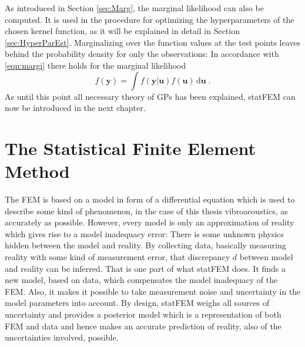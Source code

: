 \documentclass[%
  a4paper,oneside,%
  11pt,%
  smallchapters,
  style=printdev,
  extramargin,
  green,%
  rgb, <cmyk>
  ]{tubsbook}
\begin{document}
As introduced in Section \ref{sec:Marg}, the marginal likelihood can also be computed. It is used in the procedure for optimizing the hyperparameters of the chosen kernel function, as it will be explained in detail in Section \ref{sec:HyperParEst}. Marginalizing over the function values at the test points leaves behind the probability density for only the observations: In accordance with \eqref{eqn:margi} there holds for the marginal likelihood
\begin{equation}
f(\bm{y}) = \int f(\bm{y}|\bm{u}) f(\bm{u}) \, \mathrm{d}\bm{u} \;.
\label{eqn:marginGP}
\end{equation}
As until this point all necessary theory of GPs has been explained, statFEM can now be introduced in the next chapter.







\section{The Statistical Finite Element Method}
The FEM is based on a model in form of a differential equation which is used to describe some kind of phenomenon, in the case of this thesis vibroacoustics, as accurately as possible. However, every model is only an approximation of reality which gives rise to a model inadequacy error: There is some unknown physics hidden between the model and reality. By collecting data, basically measuring reality with some kind of measurement error, that discrepancy $d$ between model and reality can be inferred. That is one part of what statFEM does. It finds a new model, based on data, which compensates the model inadequacy of the FEM. Also, it makes it possible to take measurement noise and uncertainty in the model parameters into account. By design, statFEM weighs all sources of uncertainty and provides a posterior model which is a representation of both FEM and data and hence makes an accurate prediction of reality, also of the uncertainties involved, possible.
\end{document}
